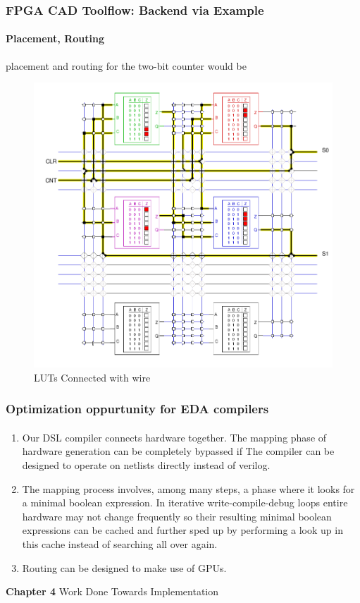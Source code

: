 \documentclass{beamer}
\begin{document}
\begin{frame}[fragile]
  \frametitle{FPGA CAD Toolflow: Backend via Example}
  \framesubtitle{Placement, Routing}

  placement and routing for the two-bit counter would be 

  \begin{figure}
    \centering
    \includegraphics[width=0.5\linewidth]{images/fpga_luts.png}
    \caption{LUTs Connected with wire\cite{brown92}}
    \label{exa_interconnect}
  \end{figure}
\end{frame}

\begin{frame}[fragile]
  \frametitle{Optimization oppurtunity for EDA compilers}
  \framesubtitle{}
  \begin{enumerate}
    \item Our DSL compiler connects hardware together. The mapping phase
      of hardware generation can be completely bypassed if The compiler can
      be designed to operate on netlists directly instead of verilog.
    \item The mapping process involves, among many steps, a phase where it looks
      for a minimal boolean expression. In iterative write-compile-debug loops
      entire hardware may not change frequently so their resulting minimal
      boolean expressions can be cached and further sped up by performing a
      look up in this cache instead of searching all over again.
    \item Routing can be designed to make use of GPUs.
  \end{enumerate}
\end{frame}

\begin{frame}[c,fragile]

  \centering
  \textbf{Chapter 4}
  Work Done Towards Implementation
\end{frame}
\end{document}
